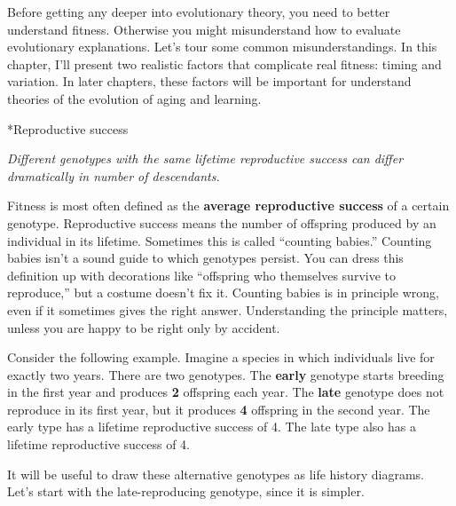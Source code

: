 \documentclass[10pt,reqno]{amsbook}
\makeatletter
\newcommand{\bemph}[1]{{\textbf{\textcolor{bemphcol}{#1}}}}
\renewcommand\section{\@startsection{section}{1}
\z@{.7\linespacing\@plus\linespacing}{.5\linespacing}
{\large\bfseries\itshape}}
\numberwithin{equation}{chapter}
\newenvironment{precis}
{\noi\itshape}
{\vspace{6pt}}
\newcommand{\noi}{\noindent}
\makeatother
\begin{document}
Before getting any deeper into evolutionary theory, you need to better understand fitness. Otherwise you might misunderstand how to evaluate evolutionary explanations. Let's tour some common misunderstandings. In this chapter, I'll present two realistic factors that complicate real fitness: timing and variation. In later chapters, these factors will be important for understand theories of the evolution of aging and learning. 


\section*{Reproductive success}

\begin{precis}Different genotypes with the same lifetime reproductive success can differ dramatically in number of descendants.
\end{precis}

Fitness is most often defined as the \bemph{average reproductive success} of a certain genotype. Reproductive success means the number of offspring produced by an individual in its lifetime. Sometimes this is called ``counting babies.'' Counting babies isn't a sound guide to which genotypes persist. You can dress this definition up with decorations like ``offspring who themselves survive to reproduce,'' but a costume doesn't fix it. Counting babies is in principle wrong, even if it sometimes gives the right answer. Understanding the principle matters, unless you are happy to be right only by accident.

Consider the following example. Imagine a species in which individuals live for exactly two years. There are two genotypes. The \bemph{early} genotype starts breeding in the first year and produces \bemph{2} offspring each year. The \bemph{late} genotype does not reproduce in its first year, but it produces \bemph{4} offspring in the second year. The early type has a lifetime reproductive success of 4. The late type also has a lifetime reproductive success of 4.

It will be useful to draw these alternative genotypes as life history diagrams. Let's start with the late-reproducing genotype, since it is simpler.
\end{document}
